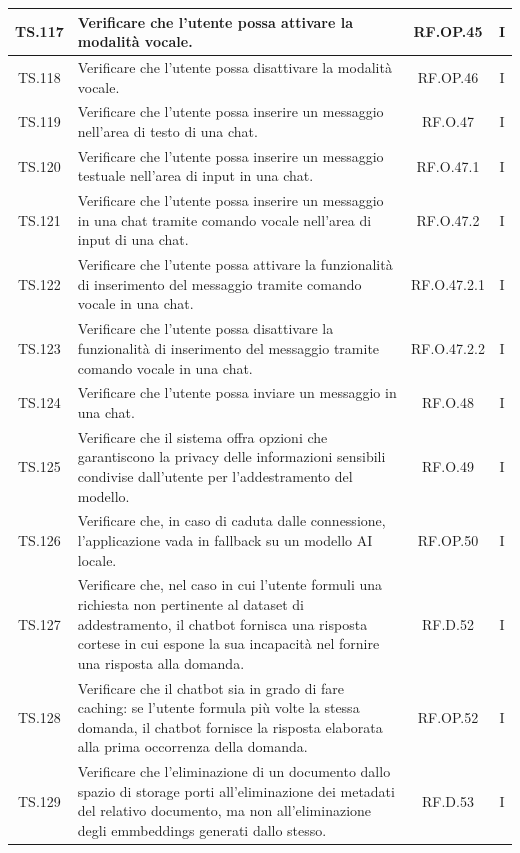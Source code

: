 \documentclass[10pt, a4paper]{article}
\begin{document}
\begin{xltabular}{\textwidth}{|c|X|c|c|}
\hline
TS.117 & Verificare che l'utente possa attivare la modalità vocale. & RF.OP.45 & I \\
\hline
TS.118 & Verificare che l'utente possa disattivare la modalità vocale. & RF.OP.46 & I \\
\hline
TS.119 & Verificare che l'utente possa inserire un messaggio nell’area di testo di una chat. & RF.O.47 & I \\
\hline
TS.120 & Verificare che l'utente possa inserire un messaggio testuale nell’area di input in una chat. & RF.O.47.1 & I \\
\hline
TS.121 & Verificare che l'utente possa inserire un messaggio in una chat tramite comando vocale nell’area di input di una chat. & RF.O.47.2 & I \\
\hline
TS.122 & Verificare che l'utente possa attivare la funzionalità di inserimento del messaggio tramite comando vocale in una chat. & RF.O.47.2.1 & I \\
\hline
TS.123 & Verificare che l'utente possa disattivare la funzionalità di inserimento del messaggio tramite comando vocale in una chat. & RF.O.47.2.2 & I \\
\hline
TS.124 & Verificare che l'utente possa inviare un messaggio in una chat. & RF.O.48 & I \\
\hline
TS.125 & Verificare che il sistema offra opzioni che garantiscono la privacy delle informazioni sensibili condivise dall’utente per l’addestramento del modello. & RF.O.49 & I \\
\hline
TS.126 & Verificare che, in caso di caduta dalle connessione, l’applicazione vada in fallback su un modello AI locale. & RF.OP.50 & I \\
\hline
TS.127 & Verificare che, nel caso in cui l’utente formuli una richiesta non pertinente al dataset di addestramento, il chatbot fornisca una risposta cortese in cui espone la sua incapacità nel fornire una risposta alla domanda. & RF.D.52 & I \\
\hline
TS.128 & Verificare che il chatbot sia in grado di fare caching: se l’utente formula più volte la stessa domanda, il chatbot fornisce la risposta elaborata alla prima occorrenza della domanda. & RF.OP.52 & I \\
\hline
TS.129 & Verificare che l’eliminazione di un documento dallo spazio di storage porti all’eliminazione dei metadati del relativo documento, ma non all’eliminazione degli emmbeddings generati dallo stesso. & RF.D.53 & I \\
\hline
\end{xltabular}
\end{document}
